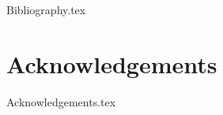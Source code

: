 \documentclass[12pt,a4paper,openright]{report}
\begin{document}


{Bibliography.tex}

\clearpage{\pagestyle{empty}\cleardoublepage}

\chapter*{Acknowledgements}

{Acknowledgements.tex}
\end{document}
